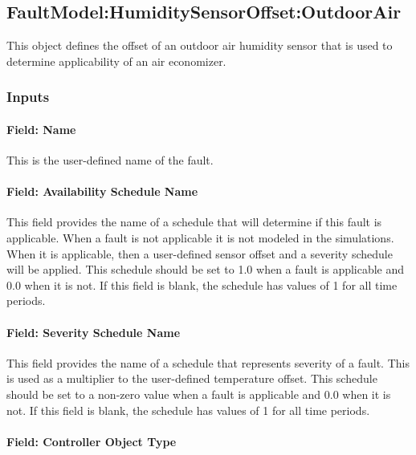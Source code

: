 \subsection{FaultModel:HumiditySensorOffset:OutdoorAir}\label{faultmodelhumiditysensoroffsetoutdoorair}

This object defines the offset of an outdoor air humidity sensor that is used to determine applicability of an air economizer.

\subsubsection{Inputs}\label{inputs-1-026}

\paragraph{Field: Name}\label{field-name-1-025}

This is the user-defined name of the fault.

\paragraph{Field: Availability Schedule Name}\label{field-availability-schedule-name-1-009}

This field provides the name of a schedule that will determine if this fault is applicable. When a fault is not applicable it is not modeled in the simulations. When it is applicable, then a user-defined sensor offset and a severity schedule will be applied. This schedule should be set to 1.0 when a fault is applicable and 0.0 when it is not. If this field is blank, the schedule has values of 1 for all time periods.

\paragraph{Field: Severity Schedule Name}\label{field-severity-schedule-name-1}

This field provides the name of a schedule that represents severity of a fault. This is used as a multiplier to the user-defined temperature offset. This schedule should be set to a non-zero value when a fault is applicable and 0.0 when it is not. If this field is blank, the schedule has values of 1 for all time periods.

\paragraph{Field: Controller Object Type}\label{field-controller-object-type-1}

